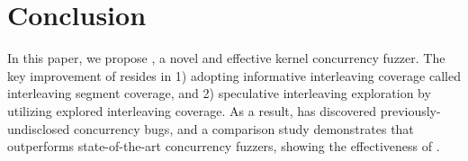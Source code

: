 \section{Conclusion}
\label{s:conclusion}




In this paper, we propose \sys, a novel and effective kernel
concurrency fuzzer.
%
The key improvement of \sys resides in 1) adopting informative
interleaving coverage called interleaving segment coverage, and 2)
speculative interleaving exploration by utilizing explored
interleaving coverage.
%
As a result, \sys has discovered \totalbugs previously-undisclosed
concurrency bugs, and a comparison study demonstrates that \sys
outperforms state-of-the-art concurrency fuzzers, showing the
effectiveness of \sys.



